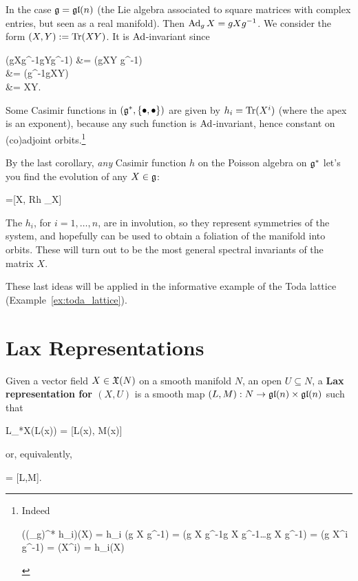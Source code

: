\documentclass[main.tex]{subfiles}
\begin{document}
\begin{example}
	In the case $\mathfrak g = \mathfrak{gl}(n)$ (the Lie algebra associated to square matrices with complex entries, but seen as a real manifold). Then $\operatorname{Ad}_g X = gXg^{-1}$. We consider the form $(X,Y) := \operatorname{Tr}(XY)$. It is $\operatorname{Ad}$-invariant since
	\begin{eqalign}
		\trace (gXg^{-1}gYg^{-1}) &= \trace (gXY g^{-1})\\
			&= \trace (g^{-1}gXY) \\
			&= \trace XY.
	\end{eqalign}
	Some Casimir functions in $(\mathfrak g^*, \{\bullet,\bullet\})$ are given by $h_i = \operatorname{Tr} (X^i)$ (where the apex is an exponent), because any such function is $\operatorname{Ad}$-invariant, hence constant on (co)adjoint orbits.\footnote{Indeed 
	\begin{eqalign}
		((\Ad_g)^* h_i)(X) = h_i (g X g^{-1}) = \trace(g X g^{-1}g X g^{-1}\dots g X g^{-1}) = \trace(g X^i g^{-1}) = \trace(X^i) = h_i(X)
	\end{eqalign}}

	By the last corollary, \emph{any} Casimir function $h$ on the Poisson algebra on $\mathfrak g^*$ let's you find the evolution of any $X \in \mathfrak g$:
	\begin{eqalign}
		 =[X, R\nabla h \vert_X]
	\end{eqalign}
	The $h_i$, for $i=1,\ldots,n$, are in involution, so they represent symmetries of the system, and hopefully can be used to obtain a foliation of the manifold into orbits. These will turn out to be the most general spectral invariants of the matrix $X$.
\end{example}

These last ideas will be applied in the informative example of the Toda lattice (Example~\ref{ex:toda_lattice}).

\section{Lax Representations}
\begin{definition}
	Given a vector field $X \in \mathfrak{X}(N)$ on a smooth manifold $N$, an open $U \subseteq N$, a \textbf{Lax representation for $(X, U)$} is a smooth map $(L, M) : N \to \mathfrak{gl}(n) \times \mathfrak{gl}(n)$ such that
	\begin{eqalign}
		L_*X(L(x)) = [L(x), M(x)]
	\end{eqalign}
	or, equivalently,
	\begin{eqalign}
		 = [L,M].
	\end{eqalign}
\end{definition}
\end{document}
